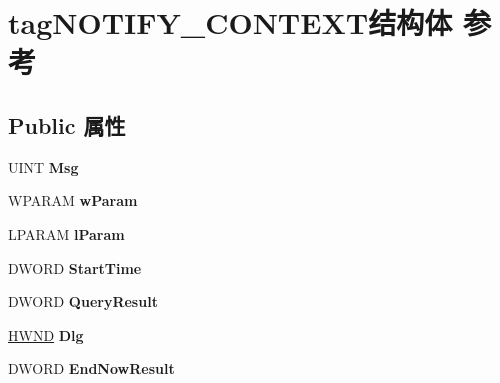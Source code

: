 \hypertarget{structtag_n_o_t_i_f_y___c_o_n_t_e_x_t}{}\section{tag\+N\+O\+T\+I\+F\+Y\+\_\+\+C\+O\+N\+T\+E\+X\+T结构体 参考}
\label{structtag_n_o_t_i_f_y___c_o_n_t_e_x_t}
\subsection*{Public 属性}
\begin{DoxyCompactItemize}
\item 
\mbox{\label{structtag_n_o_t_i_f_y___c_o_n_t_e_x_t_a2db4111ab42f77bcd1d314cb6e3b3921}} 
U\+I\+NT {\bfseries Msg}
\item 
\mbox{\label{structtag_n_o_t_i_f_y___c_o_n_t_e_x_t_a7c0ab4c441b33d9dff097486ddf10e7f}} 
W\+P\+A\+R\+AM {\bfseries w\+Param}
\item 
\mbox{\label{structtag_n_o_t_i_f_y___c_o_n_t_e_x_t_a9237a520ce32c8c7d09e2c7ed24ef2e6}} 
L\+P\+A\+R\+AM {\bfseries l\+Param}
\item 
\mbox{\label{structtag_n_o_t_i_f_y___c_o_n_t_e_x_t_aec8a79352d8fabe127ab842ea9081b7c}} 
D\+W\+O\+RD {\bfseries Start\+Time}
\item 
\mbox{\label{structtag_n_o_t_i_f_y___c_o_n_t_e_x_t_abab0fed9f99bf18a733c89b3559599a1}} 
D\+W\+O\+RD {\bfseries Query\+Result}
\item 
\mbox{\label{structtag_n_o_t_i_f_y___c_o_n_t_e_x_t_acc1d072aa516ae57f1f7c08a5ed0923a}} 
\hyperlink{interfacevoid}{H\+W\+ND} {\bfseries Dlg}
\item 
\mbox{\label{structtag_n_o_t_i_f_y___c_o_n_t_e_x_t_a8b90fad3f2adee44d1cb706a30d87fe3}} 
D\+W\+O\+RD {\bfseries End\+Now\+Result}
\item 
\mbox{\label{structtag_n_o_t_i_f_y___c_o_n_t_e_x_t_ab05807c154f78c8d403862c6c84eedf9}} 

\end{DoxyCompactItemize}
